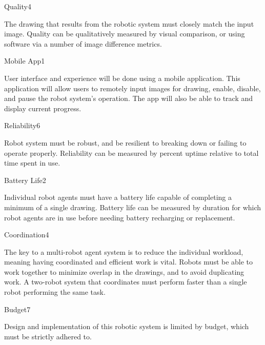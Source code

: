 \begin{nonfunctional_requirement}{Quality}{4}
\item The drawing that results from the robotic system must closely match the input image. Quality can be qualitatively measured by visual comparison, or using software via a number of image difference metrics.
\end{nonfunctional_requirement}

\begin{nonfunctional_requirement}{Mobile App}{1}
\item User interface and experience will be done using a mobile application. This application will allow users to remotely input images for drawing, enable, disable, and pause the robot system's operation. The app will also be able to track and display current progress.
\end{nonfunctional_requirement}

\begin{nonfunctional_requirement}{Reliability}{6}
\item Robot system must be robust, and be resilient to breaking down or failing to operate properly. Reliability can be measured by percent uptime relative to total time spent in use.
\end{nonfunctional_requirement}

\begin{nonfunctional_requirement}{Battery Life}{2}
\item Individual robot agents must have a battery life capable of completing a minimum of a single drawing. Battery life can be measured by duration for which robot agents are in use before needing battery recharging or replacement.
\end{nonfunctional_requirement}

\begin{nonfunctional_requirement}{Coordination}{4}
\item The key to a multi-robot agent system is to reduce the individual workload, meaning having coordinated and efficient work is vital. Robots must be able to work together to minimize overlap in the drawings, and to avoid duplicating work. A two-robot system that coordinates must perform faster than a single robot performing the same task.
\end{nonfunctional_requirement}

\begin{nonfunctional_requirement}{Budget}{7}
\label{nfr:budget}
\item Design and implementation of this robotic system is limited by budget, which must be strictly adhered to. 
\end{nonfunctional_requirement}

